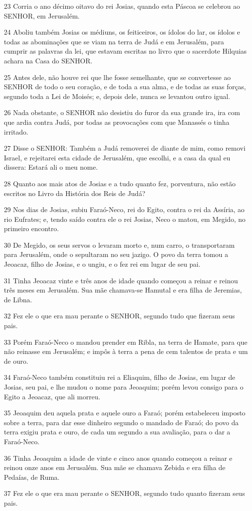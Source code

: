 \par 23 Corria o ano décimo oitavo do rei Josias, quando esta Páscoa se celebrou ao SENHOR, em Jerusalém.
\par 24 Aboliu também Josias os médiuns, os feiticeiros, os ídolos do lar, os ídolos e todas as abominações que se viam na terra de Judá e em Jerusalém, para cumprir as palavras da lei, que estavam escritas no livro que o sacerdote Hilquias achara na Casa do SENHOR.
\par 25 Antes dele, não houve rei que lhe fosse semelhante, que se convertesse ao SENHOR de todo o seu coração, e de toda a sua alma, e de todas as suas forças, segundo toda a Lei de Moisés; e, depois dele, nunca se levantou outro igual.
\par 26 Nada obstante, o SENHOR não desistiu do furor da sua grande ira, ira com que ardia contra Judá, por todas as provocações com que Manassés o tinha irritado.
\par 27 Disse o SENHOR: Também a Judá removerei de diante de mim, como removi Israel, e rejeitarei esta cidade de Jerusalém, que escolhi, e a casa da qual eu dissera: Estará ali o meu nome.
\par 28 Quanto aos mais atos de Josias e a tudo quanto fez, porventura, não estão escritos no Livro da História dos Reis de Judá?
\par 29 Nos dias de Josias, subiu Faraó-Neco, rei do Egito, contra o rei da Assíria, ao rio Eufrates; e, tendo saído contra ele o rei Josias, Neco o matou, em Megido, no primeiro encontro.
\par 30 De Megido, os seus servos o levaram morto e, num carro, o transportaram para Jerusalém, onde o sepultaram no seu jazigo. O povo da terra tomou a Jeoacaz, filho de Josias, e o ungiu, e o fez rei em lugar de seu pai.
\par 31 Tinha Jeoacaz vinte e três anos de idade quando começou a reinar e reinou três meses em Jerusalém. Sua mãe chamava-se Hamutal e era filha de Jeremias, de Libna.
\par 32 Fez ele o que era mau perante o SENHOR, segundo tudo que fizeram seus pais.
\par 33 Porém Faraó-Neco o mandou prender em Ribla, na terra de Hamate, para que não reinasse em Jerusalém; e impôs à terra a pena de cem talentos de prata e um de ouro.
\par 34 Faraó-Neco também constituiu rei a Eliaquim, filho de Josias, em lugar de Josias, seu pai, e lhe mudou o nome para Jeoaquim; porém levou consigo para o Egito a Jeoacaz, que ali morreu.
\par 35 Jeoaquim deu aquela prata e aquele ouro a Faraó; porém estabeleceu imposto sobre a terra, para dar esse dinheiro segundo o mandado de Faraó; do povo da terra exigiu prata e ouro, de cada um segundo a sua avaliação, para o dar a Faraó-Neco.
\par 36 Tinha Jeoaquim a idade de vinte e cinco anos quando começou a reinar e reinou onze anos em Jerusalém. Sua mãe se chamava Zebida e era filha de Pedaías, de Ruma.
\par 37 Fez ele o que era mau perante o SENHOR, segundo tudo quanto fizeram seus pais.

